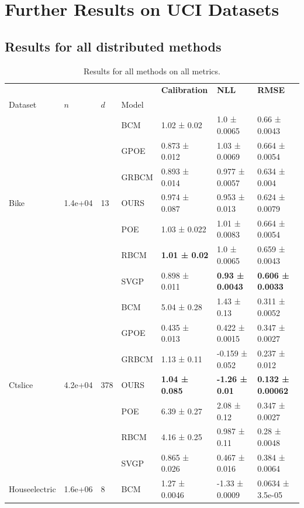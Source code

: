 \pagebreak
\section{Further Results on UCI Datasets}
\subsection{Results for all distributed methods}
\begin{table}[ht]
\centering\small
\caption[]{Results for all methods on all metrics.}
\label{tab:metrics_all_long}
\begin{tabular}{lllllll}
\toprule
 &  &  &  & \textbf{Calibration} & \textbf{NLL} & \textbf{RMSE} \\
Dataset & \(n\) & \(d\) & Model &  &  &  \\
\midrule
\midrule
\multirow[c]{7}{*}{Bike} & \multirow[c]{7}{*}{1.4e+04} & \multirow[c]{7}{*}{13} & BCM & 1.02 ± 0.02 & 1.0 ± 0.0065 & 0.66 ± 0.0043 \\
 &  &  & GPOE & 0.873 ± 0.012 & 1.03 ± 0.0069 & 0.664 ± 0.0054 \\
 &  &  & GRBCM & 0.893 ± 0.014 & 0.977 ± 0.0057 & 0.634 ± 0.004 \\
 &  &  & OURS & 0.974 ± 0.087 & 0.953 ± 0.013 & 0.624 ± 0.0079 \\
 &  &  & POE & 1.03 ± 0.022 & 1.01 ± 0.0083 & 0.664 ± 0.0054 \\
 &  &  & RBCM & \bfseries 1.01 ± 0.02 & 1.0 ± 0.0065 & 0.659 ± 0.0043 \\
 &  &  & SVGP & 0.898 ± 0.011 & \bfseries 0.93 ± 0.0043 & \bfseries 0.606 ± 0.0033 \\
\midrule
\multirow[c]{7}{*}{Ctslice} & \multirow[c]{7}{*}{4.2e+04} & \multirow[c]{7}{*}{378} & BCM & 5.04 ± 0.28 & 1.43 ± 0.13 & 0.311 ± 0.0052 \\
 &  &  & GPOE & 0.435 ± 0.013 & 0.422 ± 0.0015 & 0.347 ± 0.0027 \\
 &  &  & GRBCM & 1.13 ± 0.11 & -0.159 ± 0.052 & 0.237 ± 0.012 \\
 &  &  & OURS & \bfseries 1.04 ± 0.085 & \bfseries -1.26 ± 0.01 & \bfseries 0.132 ± 0.00062 \\
 &  &  & POE & 6.39 ± 0.27 & 2.08 ± 0.12 & 0.347 ± 0.0027 \\
 &  &  & RBCM & 4.16 ± 0.25 & 0.987 ± 0.11 & 0.28 ± 0.0048 \\
 &  &  & SVGP & 0.865 ± 0.026 & 0.467 ± 0.016 & 0.384 ± 0.0064 \\
\midrule
\multirow[c]{7}{*}{Houseelectric} & \multirow[c]{7}{*}{1.6e+06} & \multirow[c]{7}{*}{8} & BCM & 1.27 ± 0.0046 & -1.33 ± 0.0009 & 0.0634 ± 3.5e-05 \\

\end{tabular}
\end{table}
